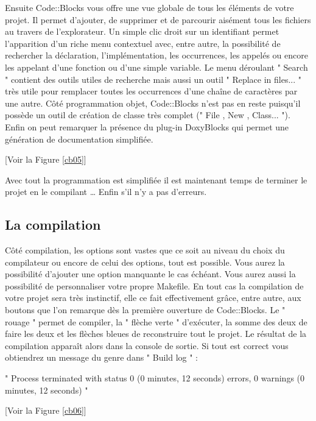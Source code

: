 \documentclass[a4paper, 12pt]{article}
\begin{document}
\begin{onehalfspacing}

	Ensuite Code::Blocks vous offre une vue globale de tous les éléments de votre projet. Il permet d'ajouter, de supprimer et de parcourir aisément tous les fichiers au travers de l'explorateur. Un simple clic droit sur un identifiant permet l'apparition d'un riche menu contextuel avec, entre autre, la possibilité de rechercher la déclaration, l'implémentation, les occurrences, les appelés ou encore les appelant d'une fonction ou d'une simple variable. Le menu déroulant " Search " contient des outils utiles de recherche mais aussi un outil " Replace in files... " très utile pour remplacer toutes les occurrences d'une chaîne de caractères par une autre. Côté programmation objet, Code::Blocks n'est pas en reste puisqu'il possède un outil de création de classe très complet (" File , New , Class... "). Enfin on peut remarquer la présence du plug-in DoxyBlocks qui permet une génération de documentation simplifiée.


[Voir la Figure \ref{cb05}]


	Avec tout la programmation est simplifiée il est maintenant temps de terminer le projet en le compilant … Enfin s'il n'y a pas d'erreurs.

\newpage \subsection{La compilation}
Côté compilation, les options sont vastes que ce soit au niveau du choix du compilateur ou encore de celui des options, tout est possible. Vous aurez la possibilité d'ajouter une option manquante le cas échéant. Vous aurez aussi la possibilité de personnaliser votre propre Makefile. En tout cas la compilation de votre projet sera très instinctif, elle ce fait effectivement grâce, entre autre, aux boutons que l'on remarque dès la première ouverture de Code::Blocks. Le " rouage " permet de compiler, la " flèche verte " d'exécuter, la somme des deux de faire les deux et les flèches bleues de reconstruire tout le projet. Le résultat de la compilation apparaît alors dans la console de sortie. Si tout est correct vous obtiendrez un message du genre dans " Build log " :
\begin{center}" Process terminated with status 0 (0 minutes, 12 seconds)  errors, 0 warnings (0 minutes, 12 seconds) "
\end{center}

[Voir la Figure \ref{cb06}]



\end{onehalfspacing}
\end{document}
